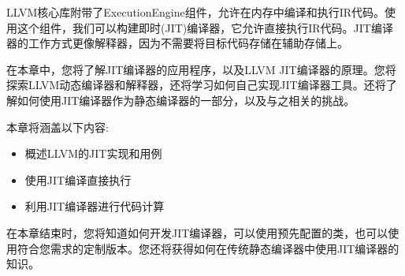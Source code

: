 LLVM核心库附带了ExecutionEngine组件，允许在内存中编译和执行IR代码。使用这个组件，我们可以构建即时(JIT)编译器，它允许直接执行IR代码。JIT编译器的工作方式更像解释器，因为不需要将目标代码存储在辅助存储上。\par

在本章中，您将了解JIT编译器的应用程序，以及LLVM JIT编译器的原理。您将探索LLVM动态编译器和解释器，还将学习如何自己实现JIT编译器工具。还将了解如何使用JIT编译器作为静态编译器的一部分，以及与之相关的挑战。\par

本章将涵盖以下内容:\par

\begin{itemize}
\item 概述LLVM的JIT实现和用例
\item 使用JIT编译直接执行
\item 利用JIT编译器进行代码计算
\end{itemize}

在本章结束时，您将知道如何开发JIT编译器，可以使用预先配置的类，也可以使用符合您需求的定制版本。您还将获得如何在传统静态编译器中使用JIT编译器的知识。\par










